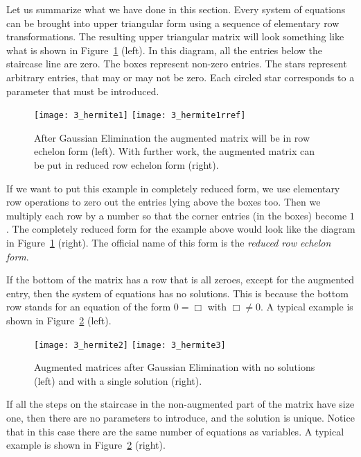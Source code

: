 Let us  summarize what we have done in this section. Every system of equations
can be brought into upper triangular form using a sequence of elementary row
transformations. The resulting upper triangular matrix will look something like
what is shown in Figure~\ref{fig_hermite1} (left).
In this diagram, all the entries below the staircase line are zero. The boxes
represent non-zero entries. The stars represent arbitrary entries, that may or
may not be zero. Each circled star corresponds to a parameter that must be
introduced.

\begin{figure}
\centerline{\texttt{[image: 3\_hermite1]}
\hspace{5mm}
\texttt{[image: 3\_hermite1rref]}}
\caption{After Gaussian Elimination the augmented matrix will be 
in row echelon form (left). With further work, the augmented matrix can 
be put in reduced row echelon form (right). 
\label{fig_hermite1}}
\end{figure}

If we want to put this example in completely reduced form, we
use elementary row operations to zero out the entries
lying above the boxes too. Then we
multiply each row by a number so that the corner entries (in the boxes)
become $1$. The completely reduced form for the example above 
would look like the diagram in Figure~\ref{fig_hermite1} (right). 
The official name of this form is the {\em reduced row echelon form}.

If the bottom of the matrix has a row that is all zeroes, except for the
augmented entry, then the system of equations has no solutions. This is because
the bottom row stands for an equation of the form $0=\Box$ with $\Box\ne 0$.
A typical example is shown in Figure~\ref{fig_hermite2} (left). 

\begin{figure}
\centerline{\texttt{[image: 3\_hermite2]}
\hspace{5mm}
\texttt{[image: 3\_hermite3]}}
\caption{Augmented matrices after Gaussian Elimination 
with no solutions (left) and with a single solution (right). 
\label{fig_hermite2}}
\end{figure}

If all the steps on the staircase in the non-augmented part of the matrix
have size one, then there are no parameters to introduce, and the solution is
unique. Notice that in this case there are the same number of equations as
variables. A typical example is shown in Figure~\ref{fig_hermite2} (right). 

